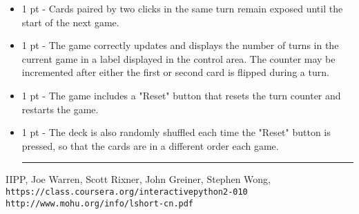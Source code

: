 \documentclass[a4paper,10pt]{article}
\begin{document}
\begin{CJK}{UTF8}{gkai}
\begin{itemize}
\item 1 pt - Cards paired by two clicks in the same turn remain exposed until the start of the next game.

\item 1 pt - The game correctly updates and displays the number of turns in the current game in a label
 displayed in the control area. The counter may be incremented after either the first or second card is flipped during a turn. 

\item 1 pt - The game includes a "Reset" button that resets the turn counter and restarts the game.

\item 1 pt - The deck is also randomly shuffled each time the "Reset" button is pressed, so that the cards are in a different order each game.
\rule{\textwidth}{0.5pt}
\end{itemize}







\medskip

\begin{thebibliography}{9}
IIPP, Joe Warren, Scott Rixner, John Greiner, Stephen Wong, \\\texttt{https://class.coursera.org/interactivepython2-010}
 \texttt{http://www.mohu.org/info/lshort-cn.pdf} 
\end{thebibliography}

\end{CJK}
\end{document}
